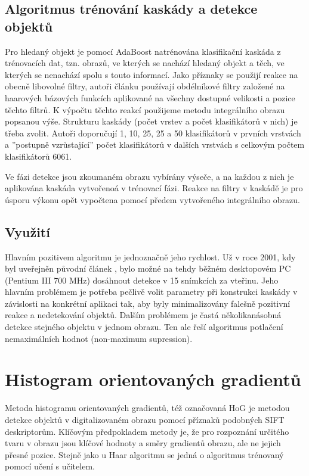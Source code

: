 	\subsection{Algoritmus trénování kaskády a detekce objektů}
	
	Pro hledaný objekt je pomocí AdaBoost natrénována klasifikační kaskáda z trénovacích dat, tzn. obrazů, ve kterých se nachází hledaný objekt a těch, ve kterých se nenachází spolu s touto informací. Jako příznaky se použijí reakce na obecně libovolné filtry, autoři článku používají obdélníkové filtry založené na haarových bázových funkcích aplikované na všechny dostupné velikosti a pozice těchto filtrů. K výpočtu těchto reakcí použijeme metodu integrálního obrazu popsanou výše. Strukturu kaskády (počet vrstev a počet klasifikátorů v nich) je třeba zvolit. Autoři doporučují 1, 10, 25, 25 a 50 klasifikátorů v prvních vrstvách a ''postupně vzrůstající''  počet klasifikátorů v dalších vrstvách s celkovým počtem klasifikátorů 6061.

	Ve fázi detekce jsou zkoumaném obrazu vybírány výseče, a na každou z nich je aplikována kaskáda vytvořenoá v trénovací fázi. Reakce na filtry v kaskádě je pro úsporu výkonu opět vypočtena pomocí předem vytvořeného integrálního obrazu.	
	
	\subsection{Využití}
	
	Hlavním pozitivem algoritmu je jednoznačně jeho rychlost. Už v roce 2001, kdy byl uveřejněn původní článek \cite{viola2001rapid}, bylo možné na tehdy běžném desktopovém PC (Pentium III 700 MHz) dosáhnout detekce v 15 snímkcích za vteřinu. Jeho hlavním problémem je potřeba pečlivě volit parametry při konstrukci kaskády v závislosti na konkrétní aplikaci tak, aby byly minimalizovány falešně pozitivní reakce a nedetekování objektů. Dalším problémem je častá několikanásobná detekce stejného objektu v jednom obrazu. Ten ale řeší algoritmus potlačení nemaximálních hodnot (non-maximum supression).
 
\section{Histogram orientovaných gradientů}

	Metoda histogramu orientovaných gradientů, též označovaná HoG \cite{dalal2005histograms} je metodou detekce objektů v digitalizovaném obrazu pomocí příznaků podobných SIFT deskriptorům. Klíčovým předpokladem metody je, že pro rozpoznání určitého tvaru v obrazu jsou klíčové hodnoty a směry gradientů obrazu, ale ne jejich přesné pozice. Stejně jako u Haar algoritmu se jedná o algoritmus trénovaný pomocí učení s učitelem.
	
